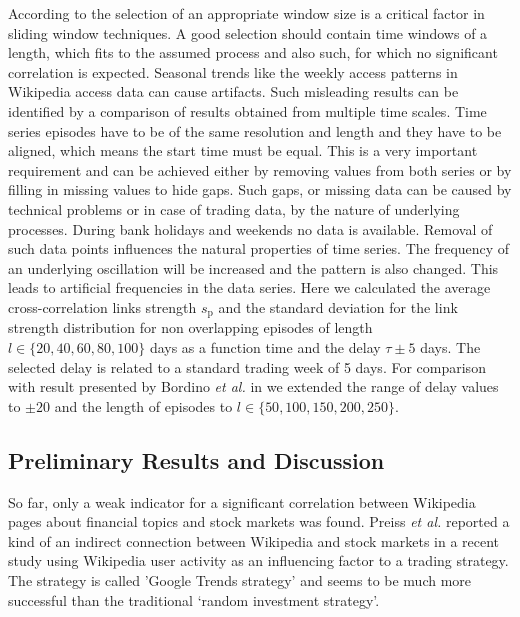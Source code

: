 \documentclass[a4paper,10pt]{scrbook}
\begin{document}
According to \cite{Krings2012} %
the selection of an appropriate window size is a critical factor in sliding window techniques. A good selection should contain time  windows of a length, which fits to the assumed process and also such, for which no significant correlation is expected. Seasonal trends like the weekly access patterns in Wikipedia access data can cause artifacts. Such misleading
results can be identified by a comparison of results obtained from multiple time scales. Time series episodes have to be of the same resolution and length and they have to be aligned, which means the start time must be equal. This is a very important requirement and can be achieved either by removing values from both series or by filling in missing values to hide gaps. Such gaps, or missing data can be caused by technical problems or in case of trading data, by the nature of underlying processes. During bank holidays and weekends no data is available. Removal of such data points influences the natural properties of time series. The frequency of an underlying oscillation will be increased and the pattern is also changed. This leads to artificial frequencies in the data series. Here we calculated the average cross-correlation links strength $s_\textrm{p}$ and the standard deviation for the link strength distribution for non overlapping episodes of length $l \in \lbrace  20, 40, 60, 80, 100 \rbrace $ days as a function time and the delay $\tau \pm 5$ days. The selected delay is related to a standard trading week of 5 days. For comparison with result presented by Bordino \textit{et al.} in \cite{Bordino} we extended the range of delay values to $\pm 20$ and the length of episodes to $l \in \lbrace  50, 100, 150, 200, 250 \rbrace$.

\subsection{Preliminary Results and Discussion}
So far, only a weak indicator for a significant correlation between Wikipedia pages about financial topics and stock markets was found. Preiss \textit{et al.} reported a kind of an indirect connection between Wikipedia and stock markets in a recent study \cite{Preis2014.WIKIPEDIA.STOCK} using Wikipedia user activity as an influencing factor to a trading strategy. The strategy is called 'Google Trends strategy' and seems to be much more successful than the traditional ‘random investment strategy’. %
\end{document}

